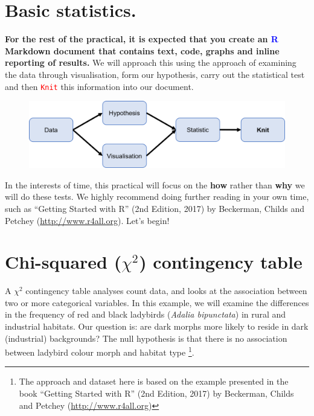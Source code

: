 \documentclass[a4paper,12pt]{article}
\newcommand\boldblue[1]{\textcolor{blue}{\textbf{#1}}}
\newcommand\code[1]{\textcolor{red}{\texttt{#1}}}
\begin{document}
\section{Basic statistics.}

\textbf{For the rest of the practical, it is expected that you create an \boldblue{R} Markdown document that contains text, code, graphs and inline reporting of results.} We will approach this using the  approach of examining the data through visualisation, form our hypothesis, carry out the statistical test and then \code{Knit} this information into our document. \\


\begin{figure}[h]
\centering 
\includegraphics[width=.8\textwidth]{figs/StatisticsFlow2.png}
\label{fig:StatisticsFlow}
\end{figure} 

In the interests of time, this practical will focus on the \textbf{how} rather than \textbf{why} we will do these tests. We highly recommend doing further reading in your own time, such as ``Getting Started with R'' (2nd Edition, 2017) by Beckerman, Childs and Petchey (\url{http://www.r4all.org}). Let's begin!



\section{Chi-squared ($\chi^{2}$) contingency table}

A $\chi ^{2}$ contingency table analyses count data, and looks at the association between two or more categorical variables. In this example, we will examine the differences in the frequency of red and black ladybirds (\textit{Adalia bipunctata}) in rural and industrial habitats. Our question is: are dark morphs more likely to reside in dark (industrial) backgrounds? The null hypothesis is that there is no association between ladybird colour morph and habitat type \footnote{The approach and dataset here is based on the example presented in the book ``Getting Started with R'' (2nd Edition, 2017) by Beckerman, Childs and Petchey (\url{http://www.r4all.org})}. \\
\end{document}

